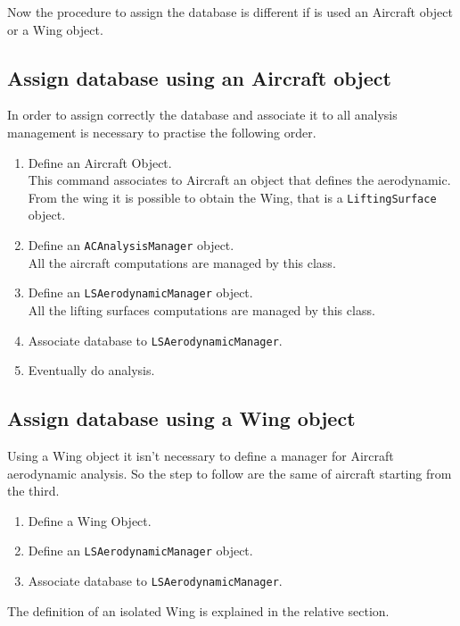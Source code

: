 Now the procedure to assign the database is different if is used an Aircraft object or a Wing object.

\subsection {Assign database using an Aircraft object}
In order to assign correctly the database and associate it to all analysis management is necessary to practise the following order.
\begin{enumerate}
\item Define an Aircraft Object.\\This command associates to Aircraft an object that defines the aerodynamic. From the wing it is possible to obtain the Wing, that is a \texttt{LiftingSurface} object.
\item Define an \texttt{ACAnalysisManager} object.\\All the aircraft computations are managed by this class.
\item Define an \texttt{LSAerodynamicManager} object.\\ All the lifting surfaces computations are managed by this class.
\item Associate database to \texttt{LSAerodynamicManager}.
\item Eventually do analysis.
\end{enumerate}

\subsection {Assign database using a Wing object}
Using a Wing object it isn't necessary to define a manager for Aircraft aerodynamic analysis. So the step to follow are the same of aircraft starting from the third.
\begin{enumerate}
\item Define a Wing Object.
\item Define an \texttt{LSAerodynamicManager} object.
\item Associate database to \texttt{LSAerodynamicManager}.
\end{enumerate}

The definition of an isolated Wing is explained in the relative section.

